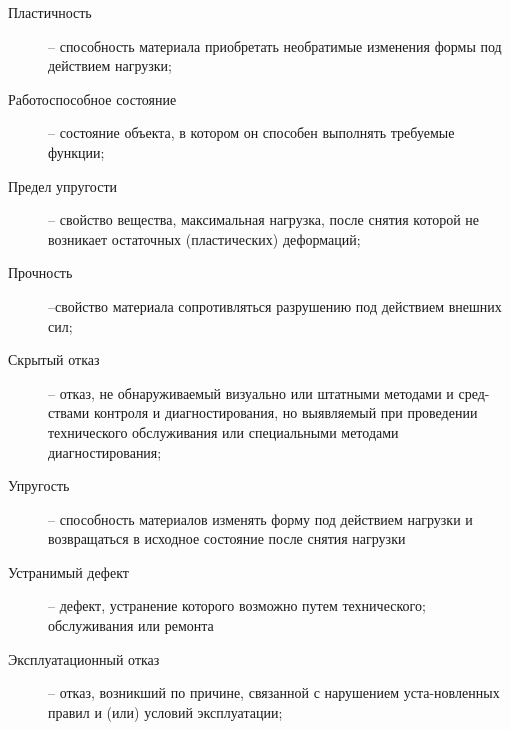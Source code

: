 \begin{description}
	\item[Пластичность] --  способность  материала
	приобретать  необратимые  изменения  формы  под действием нагрузки;
	\item
	[Работоспособное состояние] -- состояние объекта, в котором он способен выполнять требуемые функции;
	\item[Предел упругости ] -- свойство вещества, максимальная нагрузка, после снятия которой не возникает остаточных (пластических) деформаций;
	\item
	[ Прочность] --свойство материала сопротивляться разрушению под действием внешних сил;
	\item
	[Скрытый отказ] -- отказ, не обнаруживаемый визуально или штатными методами и сред-ствами контроля и диагностирования, но выявляемый при проведении технического обслуживания или специальными методами диагностирования;
	\item
	[Упругость] --  способность  материалов  изменять форму  под  действием  нагрузки  и  возвращаться  в исходное состояние после снятия нагрузки
	\item
	[Устранимый дефект] -- дефект, устранение которого возможно путем технического;
	обслуживания или ремонта
	
	
	\item
	[Эксплуатационный отказ] -- отказ, возникший по причине, связанной с нарушением уста-новленных правил и (или) условий эксплуатации;
	

\end{description}
